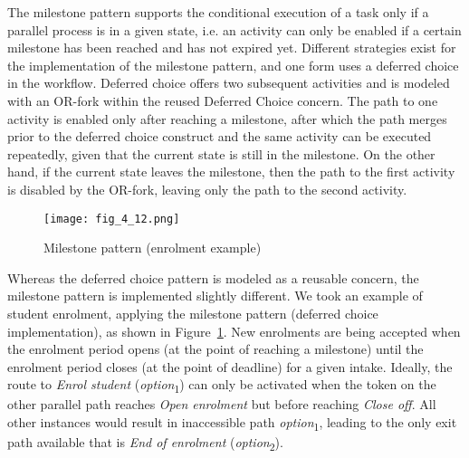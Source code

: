 The milestone pattern supports the conditional execution of a task only if a parallel process is in a given state, i.e. an activity can only be enabled if a certain milestone has been reached and has not expired yet. Different strategies exist for the implementation of the milestone pattern, and one form uses a deferred choice in the workflow. Deferred choice offers two subsequent activities and is modeled with an OR-fork within the reused Deferred Choice concern. The path to one activity is enabled only after reaching a milestone, after which the path merges prior to the deferred choice construct and the same activity can be executed repeatedly, given that the current state is still in the milestone. On the other hand, if the current state leaves the milestone, then the path to the first activity is disabled by the OR-fork, leaving only the path to the second activity.

\begin{figure}
	\centering
	\texttt{[image: fig\_4\_12.png]}
	\caption{Milestone pattern (enrolment example)}
	\label{fig:4.12}
\end{figure}

Whereas the deferred choice pattern is modeled as a reusable concern, the milestone pattern is implemented slightly different. We took an example of student enrolment, applying the milestone pattern (deferred choice implementation), as shown in Figure~\ref{fig:4.12}. New enrolments are being accepted when the enrolment period opens (at the point of reaching a milestone) until the enrolment period closes (at the point of deadline) for a given intake. Ideally, the route to \emph{Enrol student} (\emph{option}\textsubscript{1}) can only be activated when the token on the other parallel path reaches \emph{Open enrolment} but before reaching \emph{Close off}. All other instances would result in inaccessible path \emph{option}\textsubscript{1}, leading to the only exit path available that is \emph{End of enrolment} (\emph{option}\textsubscript{2}).
